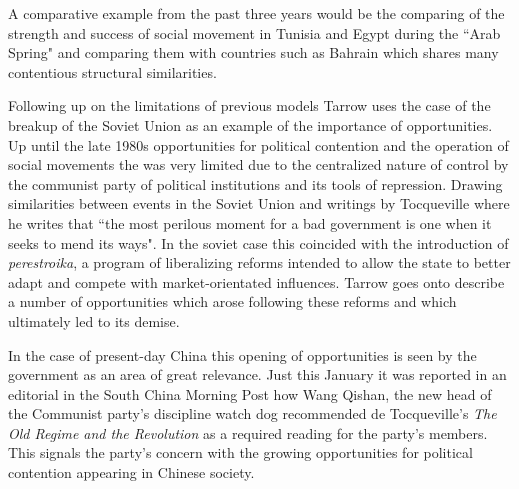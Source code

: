 \documentclass[12pt, a4paper]{article}
\begin{document}
A comparative example from the past three years would be the comparing of the strength and success of social movement in Tunisia and Egypt during the ``Arab Spring" and comparing them with countries such as Bahrain which shares many contentious structural similarities.

Following up on the limitations of previous models Tarrow uses the case of the breakup of the Soviet Union as an example of the importance of opportunities. Up until the late 1980s opportunities for political contention and the operation of social movements the was very limited due to the centralized nature of control by the communist party of political institutions and its tools of repression. Drawing similarities between events in the Soviet Union and writings by Tocqueville where he writes that ``the most perilous moment for a bad government is one when it seeks to mend its ways".\citep{de1955old} In the soviet case this coincided with the introduction of \emph{perestroika}, a program of liberalizing reforms intended to allow the state to better adapt and compete with market-orientated influences. Tarrow goes onto describe a number of opportunities which arose following these reforms and which ultimately led to its demise.

In the  case of present-day China this opening of opportunities is seen by the government as an area of great relevance. Just this January it was reported in an editorial in the South China Morning Post how Wang Qishan, the new head of the Communist party's discipline watch dog recommended de Tocqueville's \emph{The Old Regime and the Revolution} as a required reading for the party's members.\citep{scmp} This signals the party's concern with the growing opportunities for political contention appearing in Chinese society.
\end{document}
